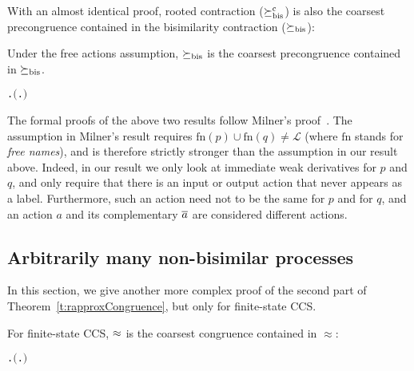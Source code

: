 With an almost identical proof, rooted contraction
($\mathrel{\succeq^{\rm{c}}_{\rm{bis}}}$) is also the coarsest
precongruence contained in the bisimilarity contraction ($\mathrel{\succeq_{\rm{bis}}}$):
\begin{theorem}
  Under the free actions assumption, $\mathrel{\succeq_{\rm{bis}}}$ is the coarsest precongruence contained in $\mathrel{\succeq_{\rm{bis}}}$.
\begin{alltt}
\HOLTokenTurnstile{} \HOLSymConst{\HOLTokenForall{}} .   \HOLSymConst{\HOLTokenConj{}}   \HOLSymConst{\HOLTokenImp{}} \ensuremath{(}\HOLSymConst{\HOLTokenForall{}}.  \HOLSymConst{\ensuremath{+}}  \HOLSymConst{\HOLTokenContracts{}}  \HOLSymConst{\ensuremath{+}} \ensuremath{)} \HOLSymConst{\HOLTokenImp{}}  \HOLSymConst{\HOLTokenObsContracts} 
\end{alltt}
\end{theorem}

The formal proofs  of the above two results follow Milner's proof~\cite{Mil89}.
The assumption in Milner's result 
requires $\mathrm{fn}(p) \cup
\mathrm{fn}(q) \neq \mathscr{L}$ (where $\mathrm{fn}$ stands for \emph{free
  names}), and is therefore strictly stronger than the assumption in
our result above. Indeed, in our result we only look at immediate weak
derivatives for $p$ and $q$, and only require that there is an input
or output action
that never appears as a label. Furthermore, such an action need
not to be the same for $p$ and for $q$,
and an action $a$ and its complementary $\overline{a}$ are
considered {different} actions.

\subsection{Arbitrarily many non-bisimilar processes}
\label{ss:arbitrarily}

In this section, we give another more complex proof of the second part
of Theorem~\ref{t:rapproxCongruence}, but only for finite-state CCS.
\begin{theorem}
    \label{thm:coarsestfiniteState}
    For finite-state CCS, $\approx$ is the coarsest congruence contained in $\approx$:
\begin{alltt}
\HOLTokenTurnstile{} \HOLSymConst{\HOLTokenForall{}} .   \HOLSymConst{\HOLTokenConj{}}   \HOLSymConst{\HOLTokenImp{}} \ensuremath{(} \HOLSymConst{\HOLTokenObsCongr}  \HOLSymConst{\HOLTokenEquiv{}} \HOLSymConst{\HOLTokenForall{}}.  \HOLSymConst{\ensuremath{+}}  \HOLSymConst{\HOLTokenWeakEQ}  \HOLSymConst{\ensuremath{+}} \ensuremath{)}
\end{alltt}
\end{theorem}

